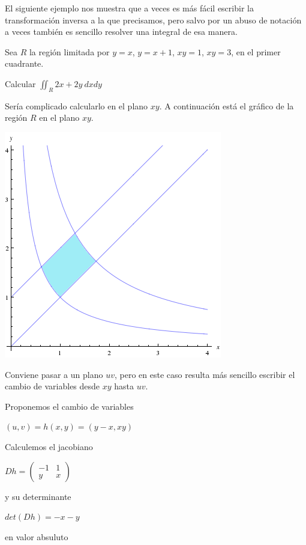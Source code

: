 El siguiente ejemplo nos muestra que a veces es más fácil escribir la transformación inversa a la que precisamos, pero salvo por un abuso de notación a veces también es sencillo resolver una integral de esa manera.

\begin{example}
Sea $R$ la región limitada por $y = x$, $y = x+1$, $xy=1$, $xy=3$, en el primer cuadrante.

Calcular $\iint_{R} 2x+2y \ dxdy$
\end{example}

Sería complicado calcularlo en el plano $xy$.  A continuación está el gráfico de la región $R$ en el plano $xy$.

\begin{center}
\includegraphics[scale=0.7]{images/04_analisis2/multiples.png}
\end{center}

Conviene pasar a un plano $uv$, pero en este caso resulta más sencillo escribir el cambio de variables desde $xy$ hasta $uv$.  

Proponemos el cambio de variables

$(u,v) = h(x,y) = (y-x, xy)$

Calculemos el jacobiano 

$Dh = \begin{pmatrix} -1 & 1 \\ y & x \end{pmatrix}$

y su determinante

$det(Dh) = -x - y$

en valor absuluto


